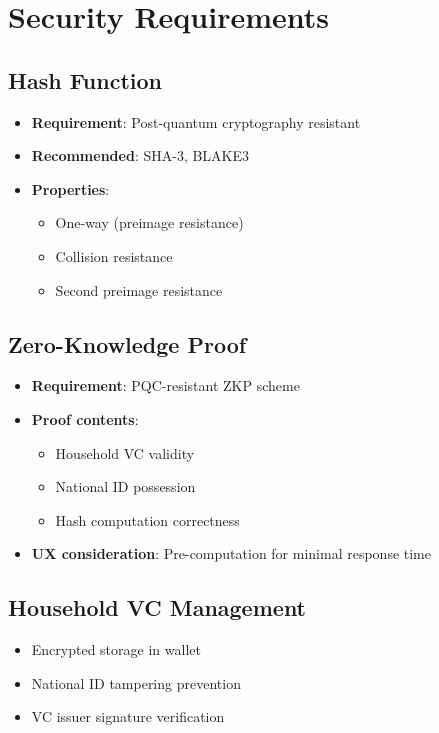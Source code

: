 \section{Security Requirements}

\subsection{Hash Function}

\begin{itemize}
  \item \textbf{Requirement}: Post-quantum cryptography resistant
  \item \textbf{Recommended}: SHA-3, BLAKE3
  \item \textbf{Properties}:
    \begin{itemize}
      \item One-way (preimage resistance)
      \item Collision resistance
      \item Second preimage resistance
    \end{itemize}
\end{itemize}

\subsection{Zero-Knowledge Proof}

\begin{itemize}
  \item \textbf{Requirement}: PQC-resistant ZKP scheme
  \item \textbf{Proof contents}:
    \begin{itemize}
      \item Household VC validity
      \item National ID possession
      \item Hash computation correctness
    \end{itemize}
  \item \textbf{UX consideration}: Pre-computation for minimal response time
\end{itemize}

\subsection{Household VC Management}

\begin{itemize}
  \item Encrypted storage in wallet
  \item National ID tampering prevention
  \item VC issuer signature verification
\end{itemize}

